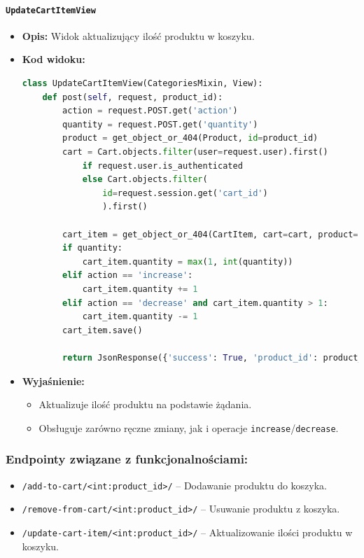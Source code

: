 \documentclass[12pt,a4paper,oneside]{article}
\theoremstyle{definition}
\numberwithin{equation}{section}
\begin{document}
\paragraph{\texttt{UpdateCartItemView}}
\begin{itemize}
    \item \textbf{Opis:} Widok aktualizujący ilość produktu w koszyku.
    \item \textbf{Kod widoku:}
\begin{lstlisting}[language=Python, caption=\texttt{UpdateCartItemView}]
class UpdateCartItemView(CategoriesMixin, View):
    def post(self, request, product_id):
        action = request.POST.get('action')
        quantity = request.POST.get('quantity')
        product = get_object_or_404(Product, id=product_id)
        cart = Cart.objects.filter(user=request.user).first() 
            if request.user.is_authenticated 
            else Cart.objects.filter(
                id=request.session.get('cart_id')
                ).first()

        cart_item = get_object_or_404(CartItem, cart=cart, product=product)
        if quantity:
            cart_item.quantity = max(1, int(quantity))
        elif action == 'increase':
            cart_item.quantity += 1
        elif action == 'decrease' and cart_item.quantity > 1:
            cart_item.quantity -= 1
        cart_item.save()

        return JsonResponse({'success': True, 'product_id': product_id, 'quantity': cart_item.quantity})
\end{lstlisting}

    \item \textbf{Wyjaśnienie:}
    \begin{itemize}
        \item Aktualizuje ilość produktu na podstawie żądania.
        \item Obsługuje zarówno ręczne zmiany, jak i operacje \texttt{increase}/\texttt{decrease}.
    \end{itemize}
\end{itemize}


\subsubsection{Endpointy związane z funkcjonalnościami:}
\begin{itemize}
    \item \texttt{/add-to-cart/<int:product\_id>/} – Dodawanie produktu do koszyka.
    \item \texttt{/remove-from-cart/<int:product\_id>/} – Usuwanie produktu z koszyka.
    \item \texttt{/update-cart-item/<int:product\_id>/} – Aktualizowanie ilości produktu w koszyku.
\end{itemize}
\end{document}
